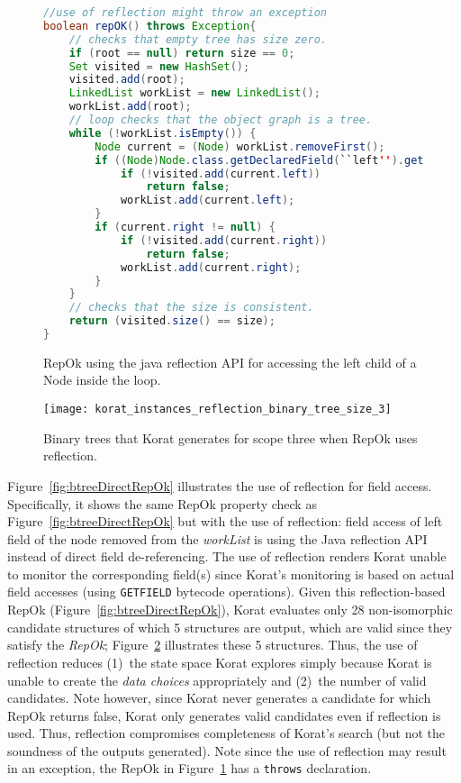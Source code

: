 \begin{figure}
\centering
\begin{lstlisting}[language=Java]
//use of reflection might throw an exception
boolean repOK() throws Exception{
    // checks that empty tree has size zero.
    if (root == null) return size == 0;
    Set visited = new HashSet();
    visited.add(root);
    LinkedList workList = new LinkedList();
    workList.add(root);
    // loop checks that the object graph is a tree.
    while (!workList.isEmpty()) {
        Node current = (Node) workList.removeFirst();
        if ((Node)Node.class.getDeclaredField(``left'').get(current) != null) {
            if (!visited.add(current.left)) 
                return false;
            workList.add(current.left);
        }
        if (current.right != null) {
            if (!visited.add(current.right))
                return false;
            workList.add(current.right);
        }
    }
    // checks that the size is consistent.
    return (visited.size() == size);
}
\end{lstlisting}
\caption{RepOk using the java reflection API for accessing the left child of a Node inside the loop.}
\label{fig:btTreeReflectionRepOK}
\end{figure}


\begin{figure}
\centering
\texttt{[image: korat\_instances\_reflection\_binary\_tree\_size\_3]}
\caption{ Binary trees that Korat generates for scope three when RepOk uses reflection.}
\label{fig:btreeReflectKoratGenScopeThree}
\end{figure}

Figure~\ref{fig:btreeDirectRepOk} illustrates the use of reflection
for field access.  Specifically, it shows the same RepOk property
check as Figure~\ref{fig:btreeDirectRepOk} but with the use of
reflection: field access of left field of the node removed from the
\emph{workList} is using the Java reflection API instead of direct
field de-referencing.  The use of reflection renders Korat unable to
monitor the corresponding field(s) since Korat's monitoring is based
on actual field accesses (using \texttt{GETFIELD} bytecode
operations).  Given this reflection-based RepOk
(Figure~\ref{fig:btreeDirectRepOk}), Korat evaluates only 28
non-isomorphic candidate structures of which 5 structures are output,
which are valid since they satisfy the \emph{RepOk};
Figure~\ref{fig:btreeReflectKoratGenScopeThree} illustrates these 5
structures.  Thus, the use of reflection reduces (1)~the state space
Korat explores simply because Korat is unable to create the \emph{data
  choices} appropriately and (2)~the number of valid candidates.  Note
however, since Korat never generates a candidate for which RepOk
returns false, Korat only generates valid candidates even if
reflection is used.  Thus, reflection compromises completeness of
Korat's search (but not the soundness of the outputs generated).  Note
since the use of reflection may result in an exception, the RepOk in
Figure~\ref{fig:btTreeReflectionRepOK} has a \texttt{throws} declaration.


